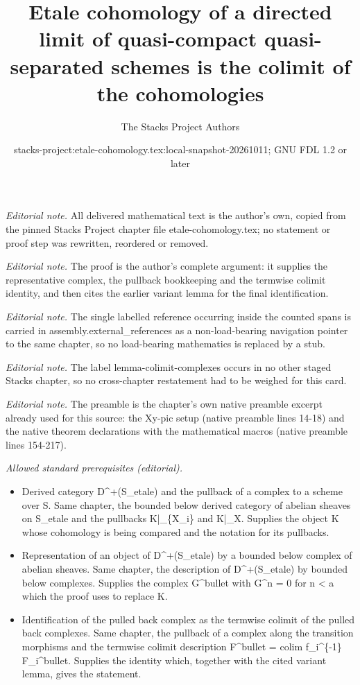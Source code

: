 \documentclass[10pt,a4paper]{amsart}
\title{Etale cohomology of a directed limit of quasi-compact quasi-separated schemes is the colimit of the cohomologies}
\author{The Stacks Project Authors}
\date{stacks-project:etale-cohomology.tex:local-snapshot-20261011; GNU FDL 1.2 or later}
\theoremstyle{plain}
\theoremstyle{definition}
\theoremstyle{remark}
\numberwithin{equation}{subsection}
\begin{document}
\maketitle
\noindent\textit{Editorial note.} All delivered mathematical text is the author's own, copied from the pinned Stacks Project chapter file etale-cohomology.tex; no statement or proof step was rewritten, reordered or removed.\par\medskip
\noindent\textit{Editorial note.} The proof is the author's complete argument: it supplies the representative complex, the pullback bookkeeping and the termwise colimit identity, and then cites the earlier variant lemma for the final identification.\par\medskip
\noindent\textit{Editorial note.} The single labelled reference occurring inside the counted spans is carried in assembly.external\_references as a non-load-bearing navigation pointer to the same chapter, so no load-bearing mathematics is replaced by a stub.\par\medskip
\noindent\textit{Editorial note.} The label lemma-colimit-complexes occurs in no other staged Stacks chapter, so no cross-chapter restatement had to be weighed for this card.\par\medskip
\noindent\textit{Editorial note.} The preamble is the chapter's own native preamble excerpt already used for this source: the Xy-pic setup (native preamble lines 14-18) and the native theorem declarations with the mathematical macros (native preamble lines 154-217).\par\medskip
\noindent\textit{Allowed standard prerequisites (editorial).}\begin{itemize}
\item Derived category D\textasciicircum{}+(S\_etale) and the pullback of a complex to a scheme over S. Same chapter, the bounded below derived category of abelian sheaves on S\_etale and the pullbacks K|\_\{X\_i\} and K|\_X. Supplies the object K whose cohomology is being compared and the notation for its pullbacks.
\item Representation of an object of D\textasciicircum{}+(S\_etale) by a bounded below complex of abelian sheaves. Same chapter, the description of D\textasciicircum{}+(S\_etale) by bounded below complexes. Supplies the complex G\textasciicircum{}bullet with G\textasciicircum{}n = 0 for n < a which the proof uses to replace K.
\item Identification of the pulled back complex as the termwise colimit of the pulled back complexes. Same chapter, the pullback of a complex along the transition morphisms and the termwise colimit description F\textasciicircum{}bullet = colim f\_i\textasciicircum{}\{-1\} F\_i\textasciicircum{}bullet. Supplies the identity which, together with the cited variant lemma, gives the statement.
\end{itemize}\medskip
\end{document}
